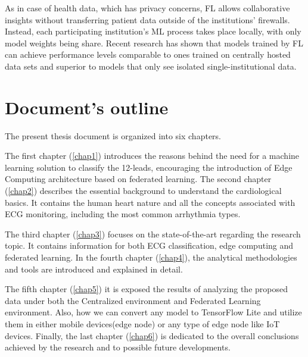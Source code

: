 As in case of health data, which has privacy concerns, FL allows collaborative insights without transferring patient data outside of the institutions’ firewalls. Instead, each participating institution’s ML process takes place locally, with only model weights being share. Recent research has shown that models trained by FL can achieve performance levels comparable to ones trained on centrally hosted data sets and superior to models that only see isolated single-institutional data. \cite{Rieke_2020}





\section{Document's outline} \label{doc_struct}

The present thesis document is organized into six chapters. 

The first chapter (\ref{chap1}) introduces the reasons behind the need for a machine learning solution to classify the 12-leads, encouraging the introduction of Edge Computing architecture based on federated learning. The second chapter (\ref{chap2}) describes the essential background to understand the cardiological basics. It contains the human heart nature and all the concepts associated with ECG monitoring, including the most common arrhythmia types.

The third chapter (\ref{chap3}) focuses on the state-of-the-art regarding the research topic. It contains information for both ECG classification, edge computing and federated learning. In the fourth chapter (\ref{chap4}), the analytical methodologies and tools are introduced and explained in detail. 

The fifth chapter (\ref{chap5}) it is exposed the results of analyzing the proposed data under both the Centralized environment and Federated Learning environment. Also, how we can convert any model to TensorFlow Lite and utilize them in either mobile devices(edge node) or any type of edge node like IoT devices.  Finally, the last chapter (\ref{chap6}) is dedicated to the overall conclusions achieved by the research and to possible future developments.